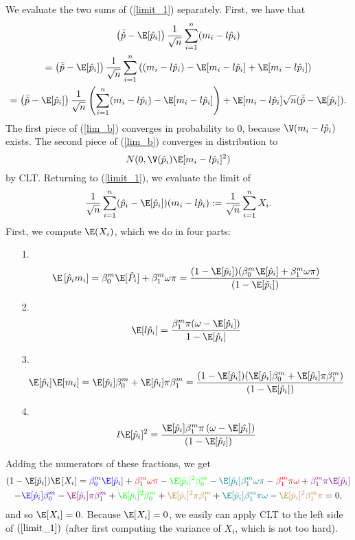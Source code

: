 \documentclass[12pt]{article}
\begin{document}
We evaluate the two sums of (\ref{limit_1}) separately. First, we have that
\begin{multline}\label{lim_b}
\left( \bar{\hat{p}} - \E[\hat{p}_i] \right) \frac{1}{\sqrt{n}} \sum_{i=1}^n (m_i - l \hat{p}_i) \\ = \left( \bar{\hat{p}} - \E[ \hat{p}_i] \right) \frac{1}{\sqrt{n}} \sum_{i=1}^n \left( (m_i - l\hat{p}_i) - \E[m_i - l \hat{p}_i] + \E[m_i - l \hat{p}_i] \right) \\ = \left( \bar{\hat{p}} - \E[ \hat{p}_i] \right) \frac{1}{\sqrt{n}} \left( \sum_{i=1}^n (m_i - l\hat{p}_i) - \E[m_i - l \hat{p}_i] \right) +  \E[m_i - l \hat{p}_i] \sqrt{n} (\bar{\hat{p}} - \E[ \hat{p}_i]).
\end{multline}
The first piece of (\ref{lim_b}) converges in probability to $0$, because $\V(m_i - l \hat{p}_i)$ exists. The second piece of (\ref{lim_b}) converges in distribution to $$N(0, \V(\hat{p}_i) \E[ m_i - l \hat{p}_i]^2)$$ by CLT. Returning to (\ref{limit_1}), we evaluate the limit of
$$ \frac{1}{\sqrt{n}} \sum_{i=1}^n ( \hat{p}_i - \E[ \hat{p}_i])(m_i - l \hat{p}_i) := \frac{1}{\sqrt{n}} \sum_{i=1}^n X_i.$$ First, we compute $\E(X_i)$, which we do in four parts:
\begin{itemize}
\item[1.] $$ \E\left[ \hat{p}_i m_i \right] = \beta_0^m \E[\hat{P}_i] + \beta^m_1 \omega \pi = \frac{(1 - \E[\hat{p}_i])( \beta_0^m \E[\hat{p}_i] + \beta^m_1 \omega \pi  )}{(1 - \E[\hat{p}_i])}$$
\item[2.] $$\E[l \hat{p}_i] = \frac{\beta_1^m \pi(\omega - \E[\hat{p}_i])}{1 - \E[\hat{p}_i]}$$
\item[3.] $$\E[\hat{p}_i] \E[m_i] = \E[\hat{p}_i] \beta^m_0 + \E[\hat{p}_i] \pi \beta^m_1 = \frac{(1 - \E[\hat{p}_i])( \E[\hat{p}_i] \beta^m_0 + \E[\hat{p}_i] \pi \beta^m_1 )}{(1 - \E[\hat{p}_i])}$$
\item[4.] $$ l \E[\hat{p}_i]^2 = \frac{ \E[\hat{p}_i] \beta^m_1 \pi \left( \omega - \E[ \hat{p_i}] \right)}{(1 - \E[\hat{p}_i])}$$
\end{itemize}
Adding the numerators of these fractions, we get
\begin{multline*}
(1 - \E[\hat{p}_i]) \E\left[X_i\right] = \textcolor{blue}{\beta^m_0 \E[ \hat{p}_i]} + \textcolor{red}{\beta^m_1\omega\pi} - \textcolor{green}{\E[\hat{p}_i]^2 \beta^m_0} - \textcolor{teal}{\E[\hat{p}_i] \beta^m_1 \omega \pi} - \textcolor{red}{\beta^m_1 \pi \omega} + \textcolor{violet}{\beta^m_1 \pi \E[\hat{p}_i]} \\ - \textcolor{blue}{\E[\hat{p}_i] \beta_0^m} - \textcolor{violet}{\E[\hat{p}_i] \pi \beta^m_1} + \textcolor{green}{\E[\hat{p}_i]^2 \beta_0^m} + \textcolor{brown}{\E[\hat{p}_i]^2 \pi \beta^m_1} + \textcolor{teal}{\E[\hat{p}_i] \beta^m_1 \pi \omega} - \textcolor{brown}{\E[\hat{p}_i]^2 \beta^m_1 \pi} = 0,
\end{multline*}
and so $\E[X_i] = 0.$ Because $\E[X_i] = 0$, we easily can apply CLT to the left side of $(\ref{limit_1})$ (after first computing the variance of $X_i$, which is not too hard).
\end{document}
